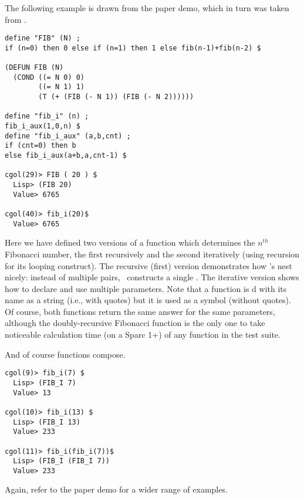 The following example is drawn from the paper demo, which in turn was taken
from \cite{suss:sicp}.

{\footnotesize	\begin{verbatim}
define "FIB" (N) ;
if (n=0) then 0 else if (n=1) then 1 else fib(n-1)+fib(n-2) $

(DEFUN FIB (N)
  (COND ((= N 0) 0)
        ((= N 1) 1)
        (T (+ (FIB (- N 1)) (FIB (- N 2)))))) 

define "fib_i" (n) ;
fib_i_aux(1,0,n) $
define "fib_i_aux" (a,b,cnt) ;
if (cnt=0) then b
else fib_i_aux(a+b,a,cnt-1) $

cgol(29)> FIB ( 20 ) $ 
  Lisp> (FIB 20) 
  Value> 6765

cgol(40)> fib_i(20)$ 
  Value> 6765
\end{verbatim}}

Here we have defined two versions of a function which determines the
$n^{th}$ Fibonacci number, the first recursively and the second iteratively
(using recursion for its looping construct).  The recursive (first) version
demonstrates how 's nest nicely:  instead of multiple
 pairs, \cgol\  constructs a single .  The iterative
version shows how to declare and use multiple parameters.  Note that a
function is d with its name as a string (i.e., with quotes) but
it is used as a symbol (without quotes).  Of course, both functions return
the same answer for the same parameters, although the doubly-recursive
Fibonacci function is the only one to take noticeable calculation time (on a
Sparc 1+) of any function in the test suite.

And of course functions compose.

{\footnotesize	\begin{verbatim}
cgol(9)> fib_i(7) $
  Lisp> (FIB_I 7) 
  Value> 13

cgol(10)> fib_i(13) $
  Lisp> (FIB_I 13) 
  Value> 233

cgol(11)> fib_i(fib_i(7))$
  Lisp> (FIB_I (FIB_I 7)) 
  Value> 233
\end{verbatim}}


Again, refer to the paper demo for a wider range of examples.  





